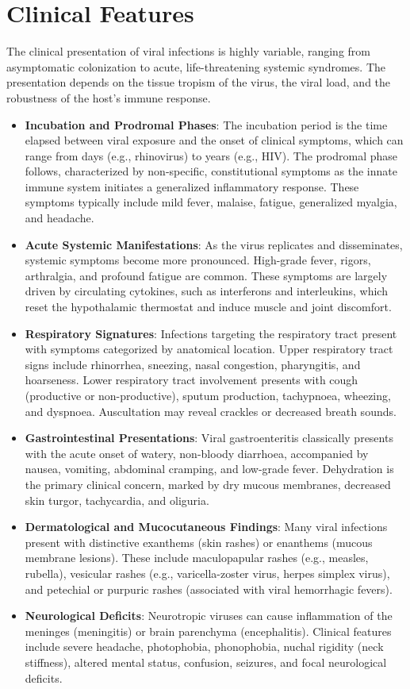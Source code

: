 \section*{Clinical Features}
The clinical presentation of viral infections is highly variable, ranging from asymptomatic colonization to acute, life-threatening systemic syndromes. The presentation depends on the tissue tropism of the virus, the viral load, and the robustness of the host's immune response.
\begin{itemize}
    \item \textbf{Incubation and Prodromal Phases}: The incubation period is the time elapsed between viral exposure and the onset of clinical symptoms, which can range from days (e.g., rhinovirus) to years (e.g., HIV). The prodromal phase follows, characterized by non-specific, constitutional symptoms as the innate immune system initiates a generalized inflammatory response. These symptoms typically include mild fever, malaise, fatigue, generalized myalgia, and headache.
    \item \textbf{Acute Systemic Manifestations}: As the virus replicates and disseminates, systemic symptoms become more pronounced. High-grade fever, rigors, arthralgia, and profound fatigue are common. These symptoms are largely driven by circulating cytokines, such as interferons and interleukins, which reset the hypothalamic thermostat and induce muscle and joint discomfort.
    \item \textbf{Respiratory Signatures}: Infections targeting the respiratory tract present with symptoms categorized by anatomical location. Upper respiratory tract signs include rhinorrhea, sneezing, nasal congestion, pharyngitis, and hoarseness. Lower respiratory tract involvement presents with cough (productive or non-productive), sputum production, tachypnoea, wheezing, and dyspnoea. Auscultation may reveal crackles or decreased breath sounds.
    \item \textbf{Gastrointestinal Presentations}: Viral gastroenteritis classically presents with the acute onset of watery, non-bloody diarrhoea, accompanied by nausea, vomiting, abdominal cramping, and low-grade fever. Dehydration is the primary clinical concern, marked by dry mucous membranes, decreased skin turgor, tachycardia, and oliguria.
    \item \textbf{Dermatological and Mucocutaneous Findings}: Many viral infections present with distinctive exanthems (skin rashes) or enanthems (mucous membrane lesions). These include maculopapular rashes (e.g., measles, rubella), vesicular rashes (e.g., varicella-zoster virus, herpes simplex virus), and petechial or purpuric rashes (associated with viral hemorrhagic fevers).
    \item \textbf{Neurological Deficits}: Neurotropic viruses can cause inflammation of the meninges (meningitis) or brain parenchyma (encephalitis). Clinical features include severe headache, photophobia, phonophobia, nuchal rigidity (neck stiffness), altered mental status, confusion, seizures, and focal neurological deficits.
\end{itemize}

